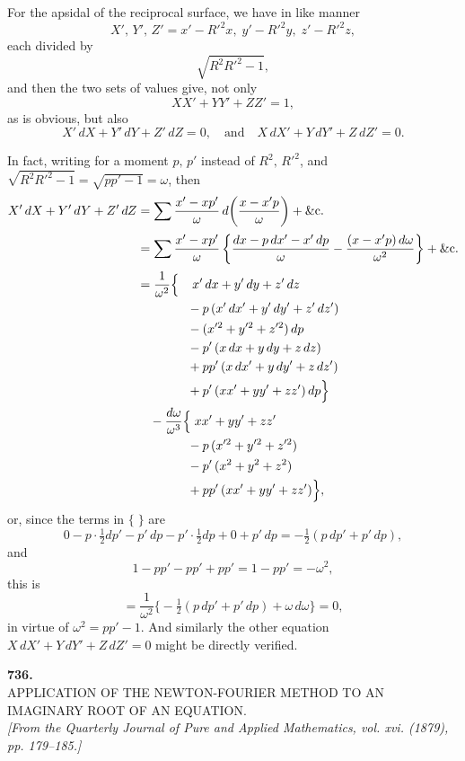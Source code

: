 \documentclass[11pt]{article}
\begin{document}
For the apsidal of the reciprocal surface, we have in like manner
\[
   X',\,Y',\,Z' = x' - R'^2 x,\; y' - R'^2 y,\; z' - R'^2 z,
\]
each divided by
\[
   \sqrt{R^2 R'^2 - 1},
\]
and then the two sets of values give, not only
\[
   XX' + YY' + ZZ' = 1,
\]
as is obvious, but also
\[
   X'\,dX + Y'\,dY + Z'\,dZ = 0,\quad\text{and}\quad X\,dX' + Y\,dY' + Z\,dZ' = 0.
\]

In fact, writing for a moment $p,\,p'$ instead of $R^2,\,R'^2$, and $\sqrt{R^2 R'^2 - 1} = \sqrt{pp' - 1} = \omega$,
then
\begin{align*}
X'\,dX + Y'\,dY + Z'\,dZ
   &= \sum \frac{x' - x p'}{\omega}\,d\!\left(\frac{x - x' p}{\omega}\right) + \&\text{c.}\\[2pt]
   &= \sum \frac{x' - x p'}{\omega}\left\{\frac{dx - p\,dx' - x'\,dp}{\omega} - \frac{(x - x' p)\,d\omega}{\omega^2}\right\} + \&\text{c.}\\[2pt]
   &= \frac{1}{\omega^2}\Bigl\{\;
        \phantom{+}x'\,dx + y'\,dy + z'\,dz \\
   &\qquad\qquad - p\,(x'\,dx' + y'\,dy' + z'\,dz') \\
   &\qquad\qquad - (x'^2 + y'^2 + z'^2)\,dp \\
   &\qquad\qquad - p'\,(x\,dx + y\,dy + z\,dz) \\
   &\qquad\qquad + p p'\,(x\,dx' + y\,dy' + z\,dz') \\
   &\qquad\qquad + p'\,(xx' + yy' + zz')\,dp\Bigr\} \\
   &\quad - \frac{d\omega}{\omega^3}\Bigl\{\;
        xx' + yy' + zz' \\
   &\qquad\qquad - p\,(x'^2 + y'^2 + z'^2) \\
   &\qquad\qquad - p'\,(x^2 + y^2 + z^2) \\
   &\qquad\qquad + p p'\,(xx' + yy' + zz')\Bigr\},
\end{align*}
or, since the terms in $\{\;\}$ are
\[
   0 - p\cdot\tfrac{1}{2}dp' - p'\,dp - p'\cdot\tfrac{1}{2}dp + 0 + p'\,dp = -\tfrac{1}{2}(p\,dp' + p'\,dp),
\]
and
\[
   1 - p p' - p p' + p p' = 1 - p p' = -\omega^2,
\]
this is
\[
   = \frac{1}{\omega^2}\bigl\{-\tfrac{1}{2}(p\,dp' + p'\,dp) + \omega\,d\omega\bigr\} = 0,
\]
in virtue of $\omega^2 = p p' - 1$. And similarly the other equation $X\,dX' + Y\,dY' + Z\,dZ' = 0$
might be directly verified.

\bigskip

\begin{center}
\textbf{736.}\\[6pt]
\textsc{APPLICATION OF THE NEWTON-FOURIER METHOD TO AN\\
IMAGINARY ROOT OF AN EQUATION.}\\[6pt]
\textit{[From the Quarterly Journal of Pure and Applied Mathematics, vol. xvi. (1879),\\
pp. 179--185.]}
\end{center}
\end{document}
